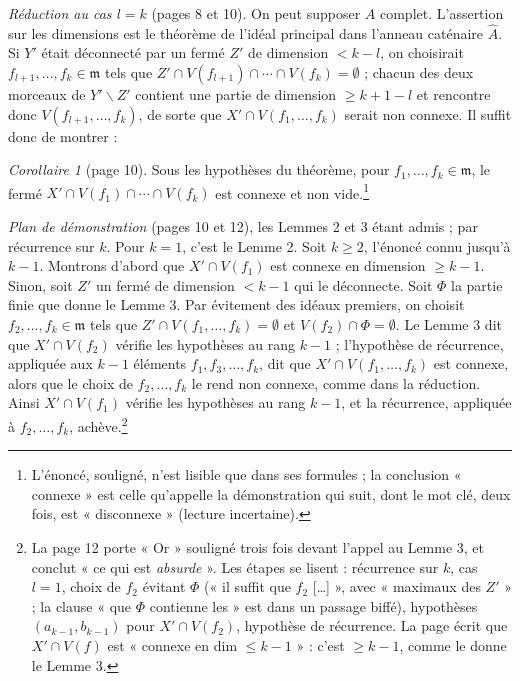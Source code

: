 \documentclass[11pt,a4paper]{article}
\begin{document}
\emph{Réduction au cas $l = k$} (pages 8 et 10). On peut supposer $A$ complet.
L'assertion sur les dimensions est le théorème de l'idéal principal dans
l'anneau caténaire $\widehat{A}$. Si $Y'$ était déconnecté par un fermé $Z'$
de dimension $< k-l$, on choisirait $f_{l+1}, \ldots, f_k \in \mathfrak{m}$
tels que $Z' \cap V(f_{l+1}) \cap \cdots \cap V(f_k) = \emptyset$ ; chacun des
deux morceaux de $Y' \smallsetminus Z'$ contient une partie de dimension
$\geq k+1-l$ et rencontre donc $V(f_{l+1}, \ldots, f_k)$, de sorte que
$X' \cap V(f_1, \ldots, f_k)$ serait non connexe. Il suffit donc de montrer :

\emph{Corollaire 1} (page 10). Sous les hypothèses du théorème, pour
$f_1, \ldots, f_k \in \mathfrak{m}$, le fermé
$X' \cap V(f_1) \cap \cdots \cap V(f_k)$ est connexe et non
vide.\footnote{L'énoncé, souligné, n'est lisible que dans ses formules ; la
conclusion « connexe » est celle qu'appelle la démonstration qui suit, dont le
mot clé, deux fois, est « disconnexe » (lecture incertaine).}

\emph{Plan de démonstration} (pages 10 et 12), les Lemmes 2 et 3 étant
admis ; par récurrence sur $k$. Pour $k = 1$, c'est le Lemme 2. Soit $k \geq 2$, l'énoncé connu jusqu'à $k-1$. Montrons
d'abord que $X' \cap V(f_1)$ est connexe en dimension $\geq k-1$. Sinon, soit
$Z'$ un fermé de dimension $< k-1$ qui le déconnecte. Soit $\Phi$ la partie
finie que donne le Lemme 3. Par évitement des idéaux premiers, on choisit
$f_2, \ldots, f_k \in \mathfrak{m}$ tels que $Z' \cap V(f_1, \ldots, f_k) =
\emptyset$ et $V(f_2) \cap \Phi = \emptyset$. Le Lemme 3 dit que
$X' \cap V(f_2)$ vérifie les hypothèses au rang $k-1$ ; l'hypothèse de
récurrence, appliquée aux $k-1$ éléments $f_1, f_3, \ldots, f_k$, dit que
$X' \cap V(f_1, \ldots, f_k)$ est connexe, alors que le choix de $f_2,
\ldots, f_k$ le rend non connexe, comme dans la réduction. Ainsi
$X' \cap V(f_1)$ vérifie les hypothèses au rang $k-1$, et la récurrence,
appliquée à $f_2, \ldots, f_k$, achève.\footnote{La page 12 porte « Or »
souligné trois fois devant l'appel au Lemme 3, et conclut « ce qui est
\emph{absurde} ». Les étapes se lisent : récurrence sur $k$, cas $l = 1$,
choix de $f_2$ évitant $\Phi$ (« il suffit que $f_2$ […] », avec
« maximaux des $Z'$ » ; la clause « que $\Phi$ contienne les » est dans un
passage biffé), hypothèses $(a_{k-1}, b_{k-1})$ pour $X' \cap V(f_2)$,
hypothèse de récurrence. La page écrit que $X' \cap V(f)$ est « connexe en
dim $\leq k-1$ » : c'est $\geq k-1$, comme le donne le Lemme 3.}
\end{document}
